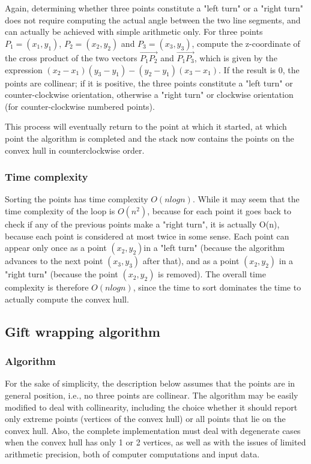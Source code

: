 \documentclass[a4paper,article,14pt]{extarticle}
\begin{document}
	Again, determining whether three points constitute a "left turn" or a "right turn" does not require computing the actual angle between the two line segments, and can actually be achieved with simple arithmetic only. For three points $P_1 = (x_1, y_1)$, $P_2 = (x_2,y_2)$ and $P_3 = (x_3, y_3)$, compute the z-coordinate of the cross product of the two vectors $\vec{P_1 P_2}$  and $\vec{P_1 P_3}$, which is given by the expression $(x_2 - x_1)(y_3 - y_1)-(y_2 - y_1)(x_3 - x_1)$. If the result is 0, the points are collinear; if it is positive, the three points constitute a "left turn" or counter-clockwise orientation, otherwise a "right turn" or clockwise orientation (for counter-clockwise numbered points).
	
	This process will eventually return to the point at which it started, at which point the algorithm is completed and the stack now contains the points on the convex hull in counterclockwise order.
	
	\subsubsection{Time complexity} 
	Sorting the points has time complexity $O(n logn)$. While it may seem that the time complexity of the loop is $O(n^2)$, because for each point it goes back to check if any of the previous points make a "right turn", it is actually O(n), because each point is considered at most twice in some sense. Each point can appear only once as a point $(x_2,y_2)$in a "left turn" (because the algorithm advances to the next point $(x_3,y_3)$ after that), and as a point $(x_2,y_2)$ in a "right turn" (because the point $(x_2,y_2)$ is removed). The overall time complexity is therefore $O(n logn)$, since the time to sort dominates the time to actually compute the convex hull. 
	
	\subsection{Gift wrapping algorithm}
	\subsubsection{Algorithm}
	For the sake of simplicity, the description below assumes that the points are in general position, i.e., no three points are collinear. The algorithm may be easily modified to deal with collinearity, including the choice whether it should report only extreme points (vertices of the convex hull) or all points that lie on the convex hull. Also, the complete implementation must deal with degenerate cases when the convex hull has only 1 or 2 vertices, as well as with the issues of limited arithmetic precision, both of computer computations and input data.
	
\end{document}

